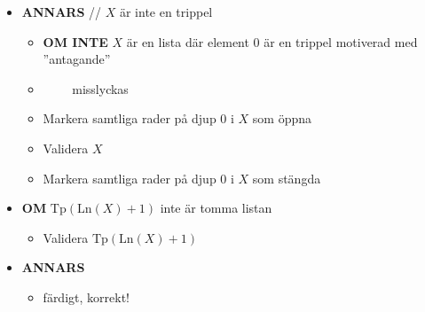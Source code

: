 \documentclass[a4paper,10.5pt]{article}
\newcommand{\Tp}[1]{\mathrm{Tp}(#1)}
\newcommand{\Ln}[1]{\mathrm{Ln}(#1)}
\newcommand{\St}[1]{\mathrm{St}(#1)}
\begin{document}
\begin{itemize}
\begin{itemize}
\begin{itemize}
\begin{itemize}
            \item[] \textbf{OM} $\St{k} \neq \lnot \St{X}$ \textbf{ELLER} $\St{m} \neq \bot$
            \item[] $\qquad$ misslyckas
            \end{itemize}
        \item[] implikationsintroduktion(k,m):
            \begin{itemize}
            \item[] \textbf{OM INTE} raderna $k$ och $m$ öppnar respektive stänger senast stängda\footnote{Se fotnot 1} box
            \item[] $\qquad$ misslyckas
            \item[] \textbf{OM} $\St{X} \neq (\St{k} \rightarrow \St{m}$)
            \item[] $\qquad$ misslyckas
            \end{itemize}
        \item[] negationsintroduktion(k,m):
            \begin{itemize}
            \item[] \textbf{OM INTE} raderna $k$ och $m$ öppnar respektive stänger senast stängda\footnote{Se fotnot 1} box
            \item[] $\qquad$ misslyckas
            \item[] \textbf{OM} $\St{m} \neq \bot$ \textbf{ELLER} $\St{X} \neq \lnot \St{k}$
            \item[] $\qquad$ misslyckas
            \end{itemize}
        \end{itemize}
    \end{itemize}
\item[] \textbf{ANNARS} // $X$ är inte en trippel
    \begin{itemize}
    \item[] \textbf{OM INTE} $X$ är en lista där element 0 är en trippel motiverad med ''antagande''
    \item[] $\qquad$ misslyckas
    \item[] Markera samtliga rader på djup 0 i $X$ som öppna
    \item[] Validera $X$
    \item[] Markera samtliga rader på djup 0 i $X$ som stängda
    \end{itemize}
\item[] \textbf{OM} $\Tp{\Ln{X} + 1}$ inte är tomma listan
    \begin{itemize}
    \item[] Validera $\Tp{\Ln{X} + 1}$
    \end{itemize}
\item[] \textbf{ANNARS}
    \begin{itemize}
    \item[] färdigt, korrekt!
    \end{itemize}
\end{itemize}
\end{document}

